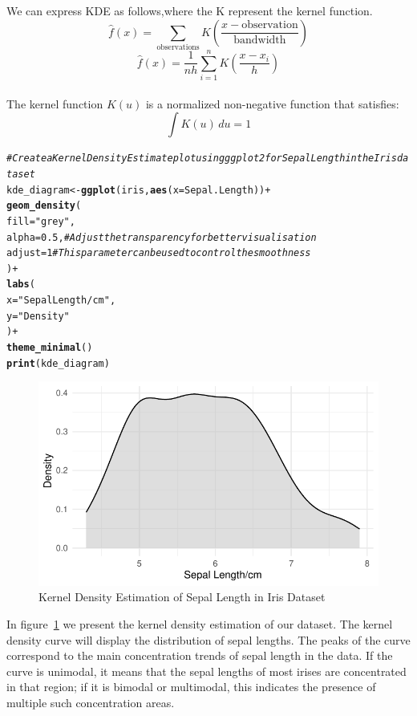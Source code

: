 \documentclass{article}\usepackage[]{graphicx}\usepackage[]{xcolor}
\makeatletter
\def\maxwidth{ %
  \ifdim\Gin@nat@width>\linewidth
    \linewidth
  \else
    \Gin@nat@width
  \fi
}
\newcommand{\hlnum}[1]{\textcolor[rgb]{0.686,0.059,0.569}{#1}}%
\newcommand{\hlstr}[1]{\textcolor[rgb]{0.192,0.494,0.8}{#1}}%
\newcommand{\hlcom}[1]{\textcolor[rgb]{0.678,0.584,0.686}{\textit{#1}}}%
\newcommand{\hlopt}[1]{\textcolor[rgb]{0,0,0}{#1}}%
\newcommand{\hlstd}[1]{\textcolor[rgb]{0.345,0.345,0.345}{#1}}%
\newcommand{\hlkwb}[1]{\textcolor[rgb]{0.69,0.353,0.396}{#1}}%
\newcommand{\hlkwc}[1]{\textcolor[rgb]{0.333,0.667,0.333}{#1}}%
\newcommand{\hlkwd}[1]{\textcolor[rgb]{0.737,0.353,0.396}{\textbf{#1}}}%
\newenvironment{kframe}{%
 \def\at@end@of@kframe{}%
 \ifinner\ifhmode%
  \def\at@end@of@kframe{\end{minipage}}%
  \begin{minipage}{\columnwidth}%
 \fi\fi%
 \def\FrameCommand##1{\hskip\@totalleftmargin \hskip-\fboxsep
 \colorbox{shadecolor}{##1}\hskip-\fboxsep
     \hskip-\linewidth \hskip-\@totalleftmargin \hskip\columnwidth}%
 \MakeFramed {\advance\hsize-\width
   \@totalleftmargin\z@ \linewidth\hsize
   \@setminipage}}%
 {\par\unskip\endMakeFramed%
 \at@end@of@kframe}
\newenvironment{knitrout}{}{} %
\makeatother
\begin{document}
We can express KDE as follows,where the K represent the kernel function.
$$\hat{f}(x) = \sum_{\text{observations}} K\left(\frac{x - \text{observation}}{\text{bandwidth}}\right)$$
$$\hat{f}(x) = \frac{1}{nh} \sum_{i=1}^{n} K\left(\frac{x - x_i}{h}\right)$$\\
The kernel function \( K(u) \) is a normalized non-negative function that satisfies:
\[ \int K(u) \, du = 1 \]
\begin{knitrout}\scriptsize
{}\color{fgcolor}\begin{kframe}
\begin{alltt}
\hlcom{# Create a Kernel Density Estimate plot using ggplot2 for Sepal Length in the Iris dataset}
\hlstd{kde_diagram} \hlkwb{<-} \hlkwd{ggplot}\hlstd{(iris,} \hlkwd{aes}\hlstd{(}\hlkwc{x} \hlstd{= Sepal.Length))} \hlopt{+}
  \hlkwd{geom_density}\hlstd{(}
    \hlkwc{fill} \hlstd{=} \hlstr{"grey"}\hlstd{,}
    \hlkwc{alpha} \hlstd{=} \hlnum{0.5}\hlstd{,}  \hlcom{# Adjust the transparency for better visualisation}
    \hlkwc{adjust} \hlstd{=} \hlnum{1}  \hlcom{# This parameter can be used to control the smoothness}
  \hlstd{)} \hlopt{+}
  \hlkwd{labs}\hlstd{(}
    \hlkwc{x} \hlstd{=} \hlstr{"Sepal Length/cm"}\hlstd{,}
    \hlkwc{y} \hlstd{=} \hlstr{"Density"}
  \hlstd{)} \hlopt{+}
  \hlkwd{theme_minimal}\hlstd{()}
\hlkwd{print}\hlstd{(kde_diagram)}
\end{alltt}
\end{kframe}\begin{figure}[H]

{\centering \includegraphics[width=\maxwidth]{figure/beamer-kde3-1} 

}

\caption[Kernel Density Estimation of Sepal Length in Iris Dataset]{Kernel Density Estimation of Sepal Length in Iris Dataset}\label{fig:kde3}
\end{figure}

\end{knitrout}
In figure~\ref{fig:kde3} we present the kernel density estimation of our dataset. The kernel density curve will display the distribution of sepal lengths. The peaks of the curve correspond to the main concentration trends of sepal length in the data. If the curve is unimodal, it means that the sepal lengths of most irises are concentrated in that region; if it is bimodal or multimodal, this indicates the presence of multiple such concentration areas.
\end{document}
